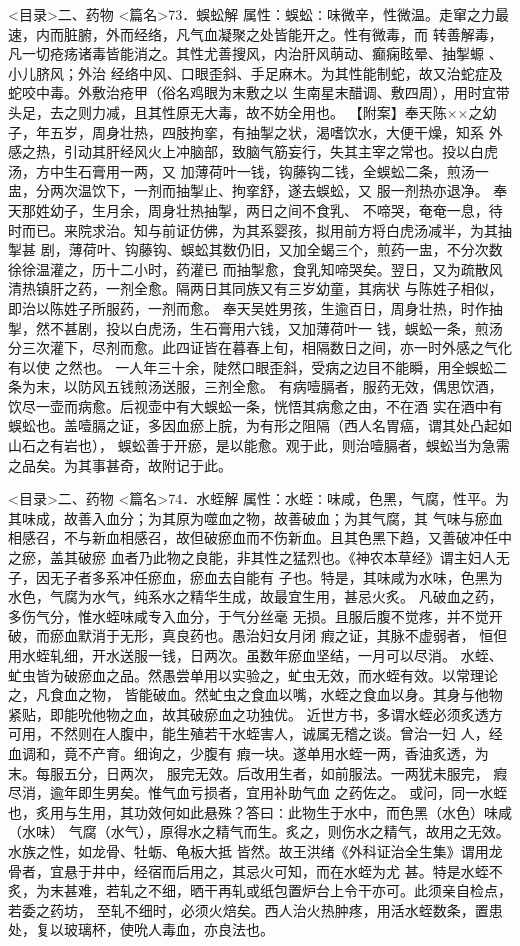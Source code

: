 \documentclass[a4paper,12pt,UTF8,twoside]{ctexbook}
\begin{document}
<目录>二、药物
<篇名>73．蜈蚣解
属性：蜈蚣∶味微辛，性微温。走窜之力最速，内而脏腑，外而经络，凡气血凝聚之处皆能开之。性有微毒，而 
转善解毒，凡一切疮疡诸毒皆能消之。其性尤善搜风，内治肝风萌动、癫痫眩晕、抽掣螈 、小儿脐风；外治 
经络中风、口眼歪斜、手足麻木。为其性能制蛇，故又治蛇症及蛇咬中毒。外敷治疮甲（俗名鸡眼为末敷之以 
生南星末醋调、敷四周），用时宜带头足，去之则力减，且其性原无大毒，故不妨全用也。 
【附案】奉天陈××之幼子，年五岁，周身壮热，四肢拘挛，有抽掣之状，渴嗜饮水，大便干燥，知系 
外感之热，引动其肝经风火上冲脑部，致脑气筋妄行，失其主宰之常也。投以白虎汤，方中生石膏用一两，又 
加薄荷叶一钱，钩藤钩二钱，全蜈蚣二条，煎汤一盅，分两次温饮下，一剂而抽掣止、拘挛舒，遂去蜈蚣，又 
服一剂热亦退净。 
奉天那姓幼子，生月余，周身壮热抽掣，两日之间不食乳、 
不啼哭，奄奄一息，待时而已。来院求治。知与前证仿佛，为其系婴孩，拟用前方将白虎汤减半，为其抽掣甚 
剧，薄荷叶、钩藤钩、蜈蚣其数仍旧，又加全蝎三个，煎药一盅，不分次数徐徐温灌之，历十二小时，药灌已 
而抽掣愈，食乳知啼哭矣。翌日，又为疏散风清热镇肝之药，一剂全愈。隔两日其同族又有三岁幼童，其病状 
与陈姓子相似，即治以陈姓子所服药，一剂而愈。 
奉天吴姓男孩，生逾百日，周身壮热，时作抽掣，然不甚剧，投以白虎汤，生石膏用六钱，又加薄荷叶一 
钱，蜈蚣一条，煎汤分三次灌下，尽剂而愈。此四证皆在暮春上旬，相隔数日之间，亦一时外感之气化有以使 
之然也。 
一人年三十余，陡然口眼歪斜，受病之边目不能瞬，用全蜈蚣二条为末，以防风五钱煎汤送服，三剂全愈。 
有病噎膈者，服药无效，偶思饮酒，饮尽一壶而病愈。后视壶中有大蜈蚣一条，恍悟其病愈之由，不在酒 
实在酒中有蜈蚣也。盖噎膈之证，多因血瘀上脘，为有形之阻隔（西人名胃癌，谓其处凸起如山石之有岩也）， 
蜈蚣善于开瘀，是以能愈。观于此，则治噎膈者，蜈蚣当为急需之品矣。为其事甚奇，故附记于此。 

<目录>二、药物
<篇名>74．水蛭解
属性：水蛭∶味咸，色黑，气腐，性平。为其味成，故善入血分；为其原为噬血之物，故善破血；为其气腐，其 
气味与瘀血相感召，不与新血相感召，故但破瘀血而不伤新血。且其色黑下趋，又善破冲任中之瘀，盖其破瘀 
血者乃此物之良能，非其性之猛烈也。《神农本草经》谓主妇人无子，因无子者多系冲任瘀血，瘀血去自能有 
子也。特是，其味咸为水味，色黑为水色，气腐为水气，纯系水之精华生成，故最宜生用，甚忌火炙。 
凡破血之药，多伤气分，惟水蛭味咸专入血分，于气分丝毫 
无损。且服后腹不觉疼，并不觉开破，而瘀血默消于无形，真良药也。愚治妇女月闭 瘕之证，其脉不虚弱者， 
恒但用水蛭轧细，开水送服一钱，日两次。虽数年瘀血坚结，一月可以尽消。 
水蛭、虻虫皆为破瘀血之品。然愚尝单用以实验之，虻虫无效，而水蛭有效。以常理论之，凡食血之物， 
皆能破血。然虻虫之食血以嘴，水蛭之食血以身。其身与他物紧贴，即能吮他物之血，故其破瘀血之功独优。 
近世方书，多谓水蛭必须炙透方可用，不然则在人腹中，能生殖若干水蛭害人，诚属无稽之谈。曾治一妇 
人，经血调和，竟不产育。细询之，少腹有 瘕一块。遂单用水蛭一两，香油炙透，为末。每服五分，日两次， 
服完无效。后改用生者，如前服法。一两犹未服完， 瘕尽消，逾年即生男矣。惟气血亏损者，宜用补助气血 
之药佐之。 
或问，同一水蛭也，炙用与生用，其功效何如此悬殊？答曰∶此物生于水中，而色黑（水色）味咸（水味） 
气腐（水气），原得水之精气而生。炙之，则伤水之精气，故用之无效。水族之性，如龙骨、牡蛎、龟板大抵 
皆然。故王洪绪《外科证治全生集》谓用龙骨者，宜悬于井中，经宿而后用之，其忌火可知，而在水蛭为尤 
甚。特是水蛭不炙，为末甚难，若轧之不细，晒干再轧或纸包置炉台上令干亦可。此须亲自检点，若委之药坊， 
至轧不细时，必须火焙矣。西人治火热肿疼，用活水蛭数条，置患处，复以玻璃杯，使吮人毒血，亦良法也。 
\end{document}
